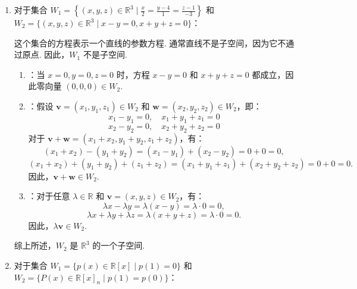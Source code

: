 \begin{exercise}
\begin{exgroup}
\begin{answer}
\begin{enumerate}
                \item 对于集合 $W_1 = \left\{(x, y, z) \in \mathbb{R}^3 \mid \frac{x}{2} = \frac{y - 4}{1} = \frac{z - 1}{-3} \right\}$ 和 $W_2 = \{(x, y, z) \in \mathbb{R}^3 \mid x - y = 0, x + y + z = 0\}$：

                这个集合的方程表示一个直线的参数方程. 通常直线不是子空间，因为它不通过原点. 因此，$W_1$ 不是子空间.

                \begin{enumerate}
                    \item {}：当 $x = 0, y = 0, z = 0$ 时，方程 $x - y = 0$ 和 $x + y + z = 0$ 都成立，因此零向量 $(0, 0, 0) \in W_2$.
                    \item {}：假设 $\mathbf{v} = (x_1, y_1, z_1) \in W_2$ 和 $\mathbf{w} = (x_2, y_2, z_2) \in W_2$，即：
                    \[
                    x_1 - y_1 = 0, \quad x_1 + y_1 + z_1 = 0
                    \]
                    \[
                    x_2 - y_2 = 0, \quad x_2 + y_2 + z_2 = 0
                    \]
                    对于 $\mathbf{v} + \mathbf{w} = (x_1 + x_2, y_1 + y_2, z_1 + z_2)$，有：
                    \[
                    (x_1 + x_2) - (y_1 + y_2) = (x_1 - y_1) + (x_2 - y_2) = 0 + 0 = 0,
                    \]
                    \[
                    (x_1 + x_2) + (y_1 + y_2) + (z_1 + z_2) = (x_1 + y_1 + z_1) + (x_2 + y_2 + z_2) = 0 + 0 = 0.
                    \]
                    因此，$\mathbf{v} + \mathbf{w} \in W_2$.
                    \item {}：对于任意 $\lambda \in \mathbb{R}$ 和 $\mathbf{v} = (x, y, z) \in W_2$，有：
                    \[
                    \lambda x - \lambda y = \lambda (x - y) = \lambda \cdot 0 = 0,
                    \]
                    \[
                    \lambda x + \lambda y + \lambda z = \lambda (x + y + z) = \lambda \cdot 0 = 0.
                    \]
                    因此，$\lambda \mathbf{v} \in W_2$.
                \end{enumerate}
                综上所述，$W_2$ 是 $\mathbb{R}^3$ 的一个子空间.

                \item 对于集合 $W_1 = \{p(x) \in \mathbb{R}[x] \mid p(1) = 0\}$ 和 $W_2 = \{P(x) \in \mathbb{R}[x]_n \mid p(1) = p(0)\}$：


\end{enumerate}
\end{answer}
\end{exgroup}
\end{exercise}
